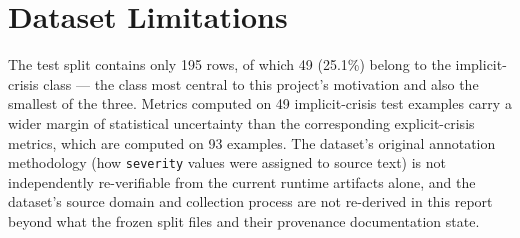 \section{Dataset Limitations}

The test split contains only 195 rows, of which 49 (25.1\%) belong to the implicit-crisis class --- the class most central to this project's motivation and also the smallest of the three. Metrics computed on 49 implicit-crisis test examples carry a wider margin of statistical uncertainty than the corresponding explicit-crisis metrics, which are computed on 93 examples. The dataset's original annotation methodology (how \texttt{severity} values were assigned to source text) is not independently re-verifiable from the current runtime artifacts alone, and the dataset's source domain and collection process are not re-derived in this report beyond what the frozen split files and their provenance documentation state.
